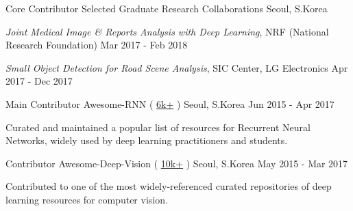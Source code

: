 

\begin{cventries}

  \cventry
    {Core Contributor} %
    {Selected Graduate Research Collaborations} %
    {Seoul, S.Korea} %
    {} %
    {
      \begin{cvitems} %
        \item \textit{Joint Medical Image \& Reports Analysis with Deep Learning}, NRF (National Research Foundation) \hfill Mar 2017 - Feb 2018
        \item \textit{Small Object Detection for Road Scene Analysis}, SIC Center, LG Electronics \hfill Apr 2017 - Dec 2017
      \end{cvitems}
    }

  \cventry
    {Main Contributor} %
    {Awesome-RNN ( \href{https://github.com/kjw0612/awesome-rnn}{ 6k+} )} %
    {Seoul, S.Korea} %
    {Jun 2015 - Apr 2017} %
    {
      \begin{cvitems} %
        \item Curated and maintained a popular list of resources for Recurrent Neural Networks, widely used by deep learning practitioners and students.
      \end{cvitems}
    }

  \cventry
    {Contributor} %
    {Awesome-Deep-Vision ( \href{https://github.com/kjw0612/awesome-deep-vision}{ 10k+} )} %
    {Seoul, S.Korea} %
    {May 2015 - Mar 2017} %
    {
      \begin{cvitems} %
        \item Contributed to one of the most widely-referenced curated repositories of deep learning resources for computer vision.
      \end{cvitems}
    }

\end{cventries}
